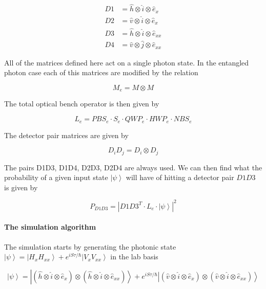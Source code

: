 \documentclass[12pt, twoside]{article}
\numberwithin{equation}{section}
\begin{document}
\begin{align}
D1 &= \hat{h} \otimes \hat{i} \otimes \hat{e}_x\\
D2 &= \hat{v} \otimes \hat{i} \otimes \hat{e}_x\\
D3 &= \hat{h} \otimes \hat{i} \otimes \hat{e}_{xx}\\
D4 &= \hat{v} \otimes \hat{j} \otimes \hat{e}_{xx}
\end{align}

All of the matrices defined here act on a single photon state. In the
entangled photon case each of this matrices are modified by the
relation\cite{rioux}

\begin{equation}M_{e} = M \otimes M\end{equation}

The total optical bench operator is then given by

\begin{equation}
L_e = PBS_e \cdot S_e \cdot QWP_e \cdot HWP_e \cdot NBS_e
\end{equation}

The detector pair matrices are given by

\begin{equation}
D_iD_j = D_i \otimes D_j
\end{equation}

The pairs D1D3, D1D4, D2D3, D2D4 are always used. We can then find what
the probability of a given input state $\left|\psi\right\rangle$ will
have of hitting a detector pair $D1D3$ is given by

\begin{equation}
P_{D1D3} = |D1D3^{T} \cdot L_e \cdot \left|\psi\right\rangle |^2
\end{equation}

\paragraph{The simulation algorithm}\label{the-simulation-algorithm}

The simulation starts by generating the photonic state
$\left|\psi\right\rangle = \left|H_xH_{xx}\right\rangle + e^{i S \tau/\hbar}\left|V_xV_{xx}\right\rangle$
in the lab basis

\begin{equation}
\left|\psi\right\rangle = \left| (\hat{h} \otimes \hat{i} \otimes \hat{e}_x) \otimes(\hat{h} \otimes \hat{i} \otimes \hat{e}_{xx}) \right\rangle + e^{i S \tau/\hbar}\left|(\hat{v} \otimes \hat{i} \otimes \hat{e}_x) \otimes(\hat{v} \otimes \hat{i} \otimes \hat{e}_{xx})\right\rangle
\end{equation}
\end{document}
